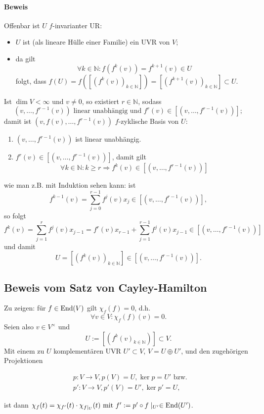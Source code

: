 \paragraph{Beweis}
	Offenbar ist $ U $ $ f $-invarianter UR:
	\begin{itemize}
		\item $ U $ ist (als lineare Hülle einer Familie) ein UVR von $ V $;
		\item da gilt
			\[ \forall k\in \mathbb{N}: f\left(f^k(v)\right)=f^{k+1}(v)\in U \]
			folgt, dass $ f(U) = f\left(\left[\left(f^k(v)\right)_{k\in{\mathbb{N}}}\right]\right) = \left[\left(f^{k+1}(v)\right)_{k\in{\mathbb{N}}}\right]\subset U. $
	\end{itemize}
	Ist $ \dim V < \infty $ und $ v\neq 0 $, so existiert $ r\in \mathbb{N} $, sodass
		\[ \left(v,\dots,f^{r-1}(v)\right) \text{ linear unabhängig und }f^r(v)\in\left[\left(v,\dots,f^{r-1}(v)\right)\right]; \]
	damit ist $ \left(v,f(v),\dots, f^{r-1}(v)\right) $ $ f $-zyklische Basis von $ U $:
	\begin{enumerate}
		\item $ \left(v,\dots,f^{r-1}(v) \right) $ ist linear unabhängig.
		\item $ f^r(v) \in \left[\left(v,\dots,f^{r-1}(v)\right)\right]$, damit gilt
		\[ \forall k\in \mathbb{N}: k\geq r \Rightarrow f^k(v)\in \left[\left(v,\dots,f^{r-1}(v)\right)\right] \]
	\end{enumerate}
	wie man z.B. mit Induktion sehen kann: ist
		\[ f^{k-1}(v) = \sum_{j=0}^{r-1}f^j(v)x_j \in \left[\left(v,\dots,f^{r-1}(v)\right) \right], \]
	so folgt
		\[ f^k(v) = \sum_{j=1}^{r}f^j(v)x_{j-1}=f^{r}(v)x_{r-1}+\sum_{j=1}^{r-1}f^j(v)x_{j-1}\in \left[\left(v,\dots,f^{r-1}(v)\right)\right] \]
	und damit
		\[ U = \left[\left(f^k(v)\right)_{k\in \mathbb{N}}\right]\in \left[\left(v,\dots,f^{r-1}(v)\right)\right]. \]
		
\subsection{Beweis vom Satz von Cayley-Hamilton}
	Zu zeigen: für $ f\in \operatorname{End}(V) $ gilt $ \chi_f(f)=0 $, d.h.
		\[ \forall v\in V:\chi_f(f)(v) = 0. \]
	Seien also $ v\in V^\times $ und
		\[ U := \left[\left( f^k(v)_{k\in \mathbb{N}}\right)\right]\subset V. \]
	Mit einem zu $ U $ komplementären UVR $ U'\subset V $, $ V=U\oplus U' $, und den zugehörigen Projektionen
	
	\begin{multicols}{2}
 	\begin{figure}[H]\centering
 		
	\end{figure}
	    \begin{align*}
		    &p: V\to V, p(V) = U, \ker p = U' \text{ bzw. } \\
		    &p':V\to V, p'(V) = U', \ker p' = U,
	    \end{align*}
	\end{multicols}
	ist dann $ \chi_f(t) = \chi_{f'}(t)\cdot \chi_{f\mid_U}(t) \text{ mit } f' := p'\circ f\mid_{U'}\in \operatorname{End}(U') $.
	
